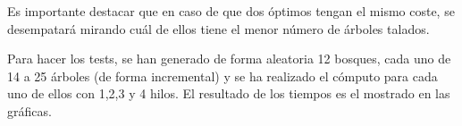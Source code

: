 \documentclass{article}
\begin{document}
Es importante destacar que en caso de que dos óptimos tengan el mismo coste, 
se desempatará mirando cuál de ellos tiene el menor número de árboles talados.

Para hacer los tests, se han generado de forma aleatoria 12 bosques, cada uno
de 14 a 25 árboles (de forma incremental) y se ha realizado el cómputo para cada
uno de ellos con 1,2,3 y 4 hilos. El resultado de los tiempos es el mostrado 
en las gráficas. 
\end{document}
